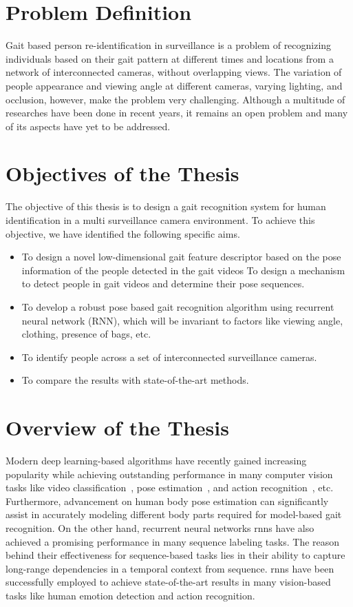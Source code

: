 \section{Problem Definition}
Gait based person re-identification in surveillance is a problem of recognizing individuals based on their gait pattern at different times and locations from a network of interconnected cameras, without overlapping views. The variation of people appearance and viewing angle at different cameras, varying lighting, and occlusion, however, make the problem very challenging. Although a multitude of researches have been done in recent years, it remains an open problem and many of its aspects have yet to be addressed.


\section{Objectives of the Thesis}
The objective of this thesis is to design a gait recognition system for human identification in a multi surveillance camera environment. To achieve this objective, we have identified the following specific aims.
\begin{itemize}
\item To design a novel low-dimensional gait feature descriptor based on the pose information of the people detected in the gait videos To design a mechanism to detect people in gait videos and determine their pose sequences. 
\item To develop a robust pose based gait recognition algorithm using recurrent neural network (RNN), which will be invariant to factors like viewing angle, clothing, presence of bags, etc.
\item To identify people across a set of interconnected surveillance cameras.
\item To compare the results with state-of-the-art methods.
\end{itemize}



\section{Overview of the Thesis}
Modern deep learning-based algorithms have recently gained increasing popularity while achieving outstanding performance in many computer vision tasks like video classification~\cite{karpathy_14}, pose estimation~\cite{Cao_19}, and action recognition~\cite{Song_17, Du_15}, etc. Furthermore, advancement on human body pose estimation can significantly assist in accurately modeling different body parts required for model-based gait recognition. On the other hand, recurrent neural networks \gls{rnn}s have also achieved a promising performance in many sequence labeling tasks. The reason behind their effectiveness for sequence-based tasks lies in their ability to capture long-range dependencies in a temporal context from sequence. \gls{rnn}s have been successfully employed to achieve state-of-the-art results in many vision-based tasks like human emotion detection and action recognition.

